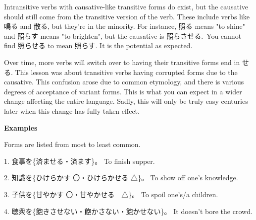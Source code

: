 \par{ Intransitive verbs with causative-like transitive forms do exist, but the causative should still come from the transitive version of the verb. These include verbs like 鳴る and 散る, but they're in the minority. For instance, 照る means "to shine" and 照らす means "to brighten", but the causative is 照らさせる. You cannot find 照らせる to mean 照らす. It is the potential as expected. }

\par{ Over time, more verbs will switch over to having their transitive forms end in せる. This lesson was about transitive verbs having corrupted forms due to the causative. This confusion arose due to common etymology, and there is various degrees of acceptance of variant forms. This is what you can expect in a wider change affecting the entire language. Sadly, this will only be truly easy centuries later when this change has fully taken effect. }

\begin{center}
\textbf{Examples }
\end{center}

\par{ Forms are listed from most to least common. }

\par{1. 食事を\{済ませる・済ます\}。 \hfill\break
To finish supper. }

\par{2. 知識を\{ひけらかす 〇・ひけらかせる △\}。 \hfill\break
To show off one's knowledge. }

\par{3. 子供を\{甘やかす 〇・甘やかせる　△\}。 \hfill\break
To spoil one's\slash a children. }

\par{4. 聴衆を\{飽きさせない・飽かさない・飽かせない\}。 \hfill\break
It doesn't bore the crowd. }
    